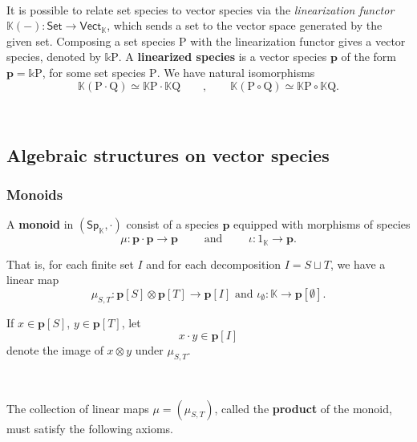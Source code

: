 \documentclass[12pt, reqno]{amsart}
\theoremstyle{definition}
\newcommand{\Vect}{\mathsf{Vect}}
\newcommand{\Set}{\mathsf{Set}}
\newcommand{\Ssk}{\mathsf{Sp}_\Kb} %
\newcommand{\Kb}{\mathbb{K}}
\newcommand{\rP}{\mathrm{P}}
\newcommand{\rQ}{\mathrm{Q}}
\newcommand{\tp}{\mathbf{p}}
\begin{document}
\

It is possible to relate set species to vector species via the \emph{linearization functor} $\mathbb{K}(-): \Set \to \Vect_{\mathbb{K}}$, which sends a set to the vector space generated by the given set. Composing a set species $\rP$ with the linearization functor gives a vector species, denoted by $\mathbb{k}\rP$. A {\bf linearized species} is a vector species $\tp$ of the form $\tp=\mathbb{k}\rP$, for some set species $\rP$. We have natural isomorphisms
 \[\mathbb{K}(\rP \cdot \rQ)\simeq \mathbb{K}\rP \cdot \mathbb{K}\rQ \qquad , \qquad \mathbb{K}(\rP \circ \rQ)\simeq \mathbb{K}\rP \circ \mathbb{K}\rQ.\]

\

\subsection{Algebraic structures on vector species}


\subsubsection{Monoids}
A {\bf monoid} in $(\Ssk, \cdot)$  consist of a species $\tp$ equipped with morphisms of species
\begin{equation*}
    \mu: \tp \cdot \tp \to \tp \qquad \text{ and } \qquad \iota: \mathrm{1}_{\mathbb{K}} \to \tp.
\end{equation*}

That is, for each finite set $I$ and for each decomposition $I=S \sqcup T$, we have a linear map 
\begin{equation*}
    \mu_{S,T}: \tp[S] \otimes \tp[T]\to \tp[I] \text{ and } \iota_\emptyset: \mathbb{K} \to \tp[\emptyset].
\end{equation*}

If $x \in \tp[S]$, $y \in \tp[T]$,  let 
\[x \cdot y \in \tp[I]\]
denote the image of $x\otimes y$ under $\mu_{S,T}$. 

\

The collection of linear maps $\mu=(\mu_{S,T})$, called the {\bf product} of the monoid, must satisfy the following axioms.

\
\end{document}
